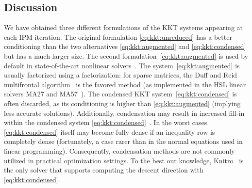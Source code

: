 \subsection{Discussion}

We have obtained three different formulations of the KKT systems
appearing at each IPM iteration.  The original formulation
\eqref{eq:kkt:unreduced} has a better
conditioning than the two alternatives \eqref{eq:kkt:augmented} and
\eqref{eq:kkt:condensed} but has a much larger size.
The second formulation~\eqref{eq:kkt:augmented} is
used by default in state-of-the-art nonlinear solvers~\cite{wachter2006implementation,waltz2006interior}.
The system~\eqref{eq:kkt:augmented} is usually factorized using a \lblt factorization: for sparse matrices, the Duff and Reid
multifrontal algorithm~\cite{duff1983multifrontal} is the favored method (as implemented in the HSL linear solvers MA27 and MA57~\cite{duff2004ma57}).
The condensed KKT system~\eqref{eq:kkt:condensed} is often discarded,
as its conditioning is higher
than \eqref{eq:kkt:augmented} (implying less accurate solutions).
Additionally, condensation may result in increased fill-in within the condensed system \eqref{eq:kkt:condensed}~\cite[Section 19.3, p.571]{nocedal_numerical_2006}.
In the worst cases \eqref{eq:kkt:condensed} itself may become fully dense if an inequality row is completely dense (fortunately, a case rarer than in the normal equations used in linear programming).
Consequently, condensation methods are not commonly utilized in practical optimization settings.
To the best our knowledge, Knitro~\cite{waltz2006interior} is the only solver that supports computing the descent direction with \eqref{eq:kkt:condensed}.

